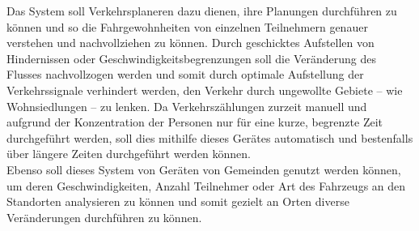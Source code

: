 
Das System soll Verkehrsplaneren dazu dienen, ihre Planungen durchführen zu können und so die Fahrgewohnheiten von einzelnen Teilnehmern genauer verstehen und nachvollziehen zu können. Durch geschicktes Aufstellen von Hindernissen oder Geschwindigkeitsbegrenzungen soll die Veränderung des Flusses nachvollzogen werden und somit durch optimale Aufstellung der Verkehrssignale verhindert werden, den Verkehr durch ungewollte Gebiete – wie Wohnsiedlungen – zu lenken. Da Verkehrszählungen zurzeit manuell und aufgrund der Konzentration der Personen nur für eine kurze, begrenzte Zeit durchgeführt werden, soll dies mithilfe dieses Gerätes automatisch und bestenfalls über längere Zeiten durchgeführt werden können.\\
Ebenso soll dieses System von Geräten von Gemeinden genutzt werden können, um deren Geschwindigkeiten, Anzahl Teilnehmer oder Art des Fahrzeugs an den Standorten analysieren zu können und somit gezielt an Orten diverse Veränderungen durchführen zu können. 
\newpage